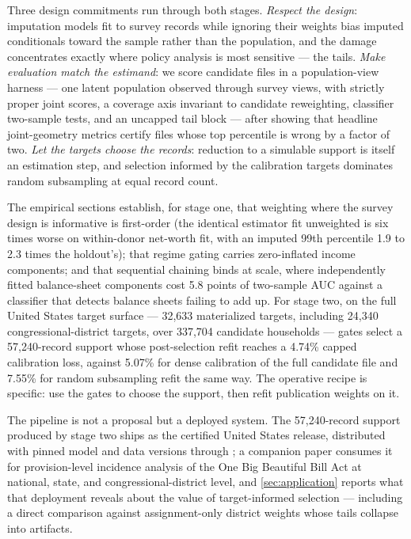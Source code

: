 Three design commitments run through both stages. \emph{Respect the
design}: imputation models fit to survey records while ignoring their
weights bias imputed conditionals toward the sample rather than the
population, and the damage concentrates exactly where policy analysis
is most sensitive --- the tails. \emph{Make evaluation match the
estimand}: we score candidate files in a population-view harness ---
one latent population observed through survey views, with strictly
proper joint scores, a coverage axis invariant to candidate
reweighting, classifier two-sample tests, and an uncapped tail block
--- after showing that headline joint-geometry metrics certify files
whose top percentile is wrong by a factor of two. \emph{Let the
targets choose the records}: reduction to a simulable support is
itself an estimation step, and selection informed by the calibration
targets dominates random subsampling at equal record count.

The empirical sections establish, for stage one, that weighting where
the survey design is informative is first-order (the identical
estimator fit unweighted is six times worse on within-donor net-worth
fit, with an imputed 99th percentile 1.9 to 2.3 times the holdout's);
that regime gating carries zero-inflated income components; and that
sequential chaining binds at scale, where independently fitted
balance-sheet components cost 5.8 points of two-sample AUC against a
classifier that detects balance sheets failing to add up. For stage
two, on the full United States target surface --- 32{,}633
materialized targets, including 24{,}340 congressional-district
targets, over 337{,}704 candidate households --- gates select a
57{,}240-record support whose post-selection refit reaches a 4.74\%
capped calibration loss, against 5.07\% for dense calibration of the
full candidate file and 7.55\% for random subsampling refit the same
way. The operative recipe is specific: use the gates to choose the
support, then refit publication weights on it.

The pipeline is not a proposal but a deployed system. The
57{,}240-record support produced by stage two ships as the certified
\populace{} United States release, distributed with pinned model and
data versions through \policyenginepy{}; a companion paper
\citep{ghenis2026obbba} consumes it for provision-level incidence
analysis of the One Big Beautiful Bill Act at national, state, and
congressional-district level, and \autoref{sec:application} reports
what that deployment reveals about the value of target-informed
selection --- including a direct comparison against assignment-only
district weights whose tails collapse into artifacts.

